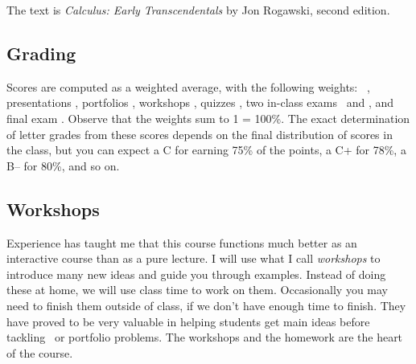 \documentclass[symmetric]{tufte-handout}
\begin{document}
    The text is \emph{Calculus: Early Transcendentals} by Jon Rogawski, second
    edition. 

\subsection{Grading}

    Scores are computed as a weighted average, with the following weights:
    \webwork\ \webworkpct, presentations \presentationpct, portfolios
    \portfoliopct, workshops \workshoppct, quizzes \quizpct, two in-class
    exams \midtermonepct\ and \midtermtwopct, and final exam \finalexampct.
    Observe that the weights sum to 1 = 100\%. The exact determination of letter grades
    from these scores depends on the final distribution of scores in the
    class, but you can expect a C for earning 75\% of the points, a C+ for
    78\%, a B-- for 80\%, and so on.

\subsection{Workshops} %
\label{sub:workshops}

    Experience has taught me that this course functions much better as an
    interactive course than as a pure lecture. I will use what I call
    \emph{workshops} to introduce many new ideas and guide you through 
    examples. Instead of doing these at home, we will use class time to
    work on them. Occasionally you may need to finish them outside of class,
    if we don't have enough time to finish. They have proved to be very
    valuable in helping students get main ideas before tackling \webwork\ or
    portfolio problems. The workshops and the homework are the heart of the
    course.
\end{document}
